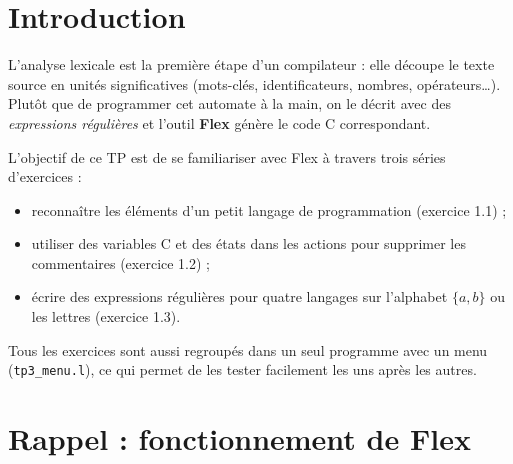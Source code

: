 \documentclass[11pt,a4paper]{article}
\begin{document}
\noindent
{}
\vspace{1em}

\section{Introduction}

L'analyse lexicale est la première étape d'un compilateur : elle découpe le texte source en
unités significatives (mots-clés, identificateurs, nombres, opérateurs\ldots). Plutôt que de
programmer cet automate à la main, on le décrit avec des \emph{expressions régulières} et
l'outil \textbf{Flex} génère le code C correspondant.

L'objectif de ce TP est de se familiariser avec Flex à travers trois séries d'exercices :
\begin{itemize}[leftmargin=1.5em]
  \item reconnaître les éléments d'un petit langage de programmation (exercice 1.1) ;
  \item utiliser des variables C et des états dans les actions pour supprimer les commentaires (exercice 1.2) ;
  \item écrire des expressions régulières pour quatre langages sur l'alphabet $\{a,b\}$ ou les lettres (exercice 1.3).
\end{itemize}

Tous les exercices sont aussi regroupés dans un seul programme avec un menu
(\texttt{tp3\_menu.l}), ce qui permet de les tester facilement les uns après les autres.

\section{Rappel : fonctionnement de Flex}
\end{document}
